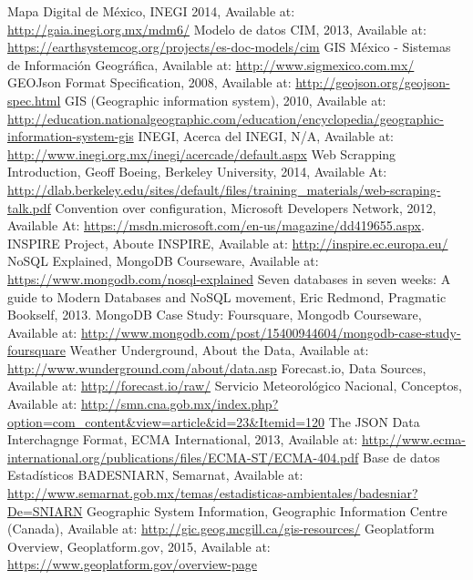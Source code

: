 \begin{thebibliography}{1}
    Mapa Digital de México, INEGI 2014, Available at: \url{http://gaia.inegi.org.mx/mdm6/}
    Modelo de datos CIM, 2013, Available at: \url{https://earthsystemcog.org/projects/es-doc-models/cim}
     GIS México - Sistemas de Información Geográfica, Available at: \url{http://www.sigmexico.com.mx/}
     GEOJson Format Specification, 2008, Available at: \url{http://geojson.org/geojson-spec.html}
     GIS (Geographic information system), 2010, Available at: \url{http://education.nationalgeographic.com/education/encyclopedia/geographic-information-system-gis}
    INEGI, Acerca del INEGI, N/A, Available at: \url{http://www.inegi.org.mx/inegi/acercade/default.aspx}
    Web Scrapping Introduction, Geoff Boeing, Berkeley University, 2014, Available At: \url{http://dlab.berkeley.edu/sites/default/files/training\_materials/web-scraping-talk.pdf}
    Convention over configuration, Microsoft Developers Network, 2012, Available At: \url{https://msdn.microsoft.com/en-us/magazine/dd419655.aspx}.
    INSPIRE Project, Aboute INSPIRE, Available at: \url{http://inspire.ec.europa.eu/}
    NoSQL Explained, MongoDB Courseware, Available at: \url{https://www.mongodb.com/nosql-explained}
    Seven databases in seven weeks: A guide to Modern Databases and NoSQL movement, Eric Redmond, Pragmatic Bookself, 2013.
    MongoDB Case Study: Foursquare, Mongodb Courseware, Available at: \url{http://www.mongodb.com/post/15400944604/mongodb-case-study-foursquare}
    Weather Underground, About the Data, Available at: \url{http://www.wunderground.com/about/data.asp}
    Forecast.io, Data Sources, Available at: \url{http://forecast.io/raw/}
        Servicio Meteorológico Nacional, Conceptos, Available at: \url{http://smn.cna.gob.mx/index.php?option=com_content&view=article&id=23&Itemid=120}
    The JSON Data Interchagnge Format, ECMA International, 2013, Available at: \url{http://www.ecma-international.org/publications/files/ECMA-ST/ECMA-404.pdf}
    Base de datos Estadísticos BADESNIARN, Semarnat, Available at: \url{http://www.semarnat.gob.mx/temas/estadisticas-ambientales/badesniar?De=SNIARN}
    Geographic System Information, Geographic Information Centre (Canada), Available at: \url{http://gic.geog.mcgill.ca/gis-resources/}
    Geoplatform Overview, Geoplatform.gov, 2015, Available at:  \url{https://www.geoplatform.gov/overview-page}

\end{thebibliography}
